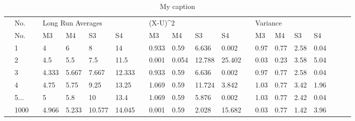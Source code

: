 \documentclass[12pt]{article}
\begin{document}
\begin{table}[]
\centering
\caption{My caption}
\label{my-label}
\begin{tabular}{l|l|l|l|l|l|l|l|l|l|l|l|l|l|l|l|l|lll}
\cline{2-17}
 & No.  &  & \multicolumn{4}{l|}{Long Run Averages} &  & \multicolumn{4}{l|}{(X-U)\textasciicircum 2} &  & \multicolumn{4}{l|}{Variance}     &  &  &  \\ \cline{2-17}
 & No.  &  & M3      & M4      & S3       & S4      &  & M3        & M4       & S3        & S4        &  & M3 & M4 & S3 & S4 &  &  &  \\ \cline{2-17}
 & 1    &  & 4       & 6       & 8        & 14      &  & 0.933     & 0.59     & 6.636     & 0.002     &  & 0.97   & 0.77   & 2.58   & 0.04   &  &  &  \\ \cline{2-17}
 & 2    &  & 4.5     & 5.5     & 7.5      & 11.5    &  & 0.001     & 0.054    & 12.788    & 25.402    &  & 0.03   & 0.23   & 3.58   & 5.04   &  &  &  \\ \cline{2-17}
 & 3    &  & 4.333   & 5.667   & 7.667    & 12.333  &  & 0.933     & 0.59     & 6.636     & 0.002     &  & 0.97   & 0.77   & 2.58   & 0.04   &  &  &  \\ \cline{2-17}
 & 4    &  & 4.75    & 5.75    & 9.25     & 13.25   &  & 1.069     & 0.59     & 11.724    & 3.842     &  & 1.03   & 0.77   & 3.42   & 1.96   &  &  &  \\ \cline{2-17}
 & 5...    &  & 5       & 5.8     & 10       & 13.4    &  & 1.069     & 0.59     & 5.876     & 0.002     &  & 1.03   & 0.77   & 2.42   & 0.04   &  &  &  \\ \cline{2-17}
 & 1000 &  & 4.966   & 5.233   & 10.577   & 14.045  &  & 0.001     & 0.59     & 2.028     & 15.682    &  & 0.03   & 0.77   & 1.42   & 3.96   &  &  &  \\ \cline{2-17}
\end{tabular}
\end{table}
\end{document}

